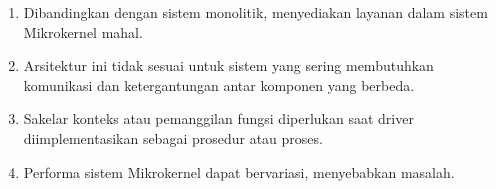 \documentclass{report}
\begin{document}
	\begin{enumerate}
		\item Dibandingkan dengan sistem monolitik, menyediakan layanan dalam sistem Mikrokernel mahal.
		
		\item Arsitektur ini tidak sesuai untuk sistem yang sering membutuhkan komunikasi dan ketergantungan antar komponen yang berbeda.
		
		\item Sakelar konteks atau pemanggilan fungsi diperlukan saat driver diimplementasikan sebagai prosedur atau proses.
		
		\item Performa sistem Mikrokernel dapat bervariasi, menyebabkan masalah.
	\end{enumerate}
	
\end{document}
